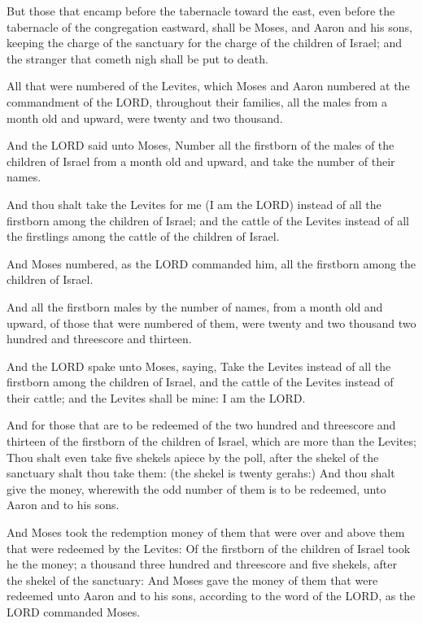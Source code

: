 \Verse But those that encamp before the tabernacle toward the east, even
before the tabernacle of the congregation eastward, shall be Moses,
and Aaron and his sons, keeping the charge of the sanctuary for the
charge of the children of Israel; and the stranger that cometh nigh
shall be put to death.

\Verse All that were numbered of the Levites, which Moses and Aaron
numbered at the commandment of the LORD, throughout their families,
all the males from a month old and upward, were twenty and two
thousand.

\Verse And the LORD said unto Moses, Number all the firstborn of the
males of the children of Israel from a month old and upward, and take
the number of their names.

\Verse And thou shalt take the Levites for me (I am the LORD) instead of
all the firstborn among the children of Israel; and the cattle of the
Levites instead of all the firstlings among the cattle of the children
of Israel.

\Verse And Moses numbered, as the LORD commanded him, all the firstborn
among the children of Israel.

\Verse And all the firstborn males by the number of names, from a month
old and upward, of those that were numbered of them, were twenty and
two thousand two hundred and threescore and thirteen.

\Verse And the LORD spake unto Moses, saying, \Verse Take the Levites
instead of all the firstborn among the children of Israel, and the
cattle of the Levites instead of their cattle; and the Levites shall
be mine: I am the LORD.

\Verse And for those that are to be redeemed of the two hundred and
threescore and thirteen of the firstborn of the children of Israel,
which are more than the Levites; \Verse Thou shalt even take five
shekels apiece by the poll, after the shekel of the sanctuary shalt
thou take them: (the shekel is twenty gerahs:) \Verse And thou shalt
give the money, wherewith the odd number of them is to be redeemed,
unto Aaron and to his sons.

\Verse And Moses took the redemption money of them that were over and
above them that were redeemed by the Levites: \Verse Of the firstborn of
the children of Israel took he the money; a thousand three hundred and
threescore and five shekels, after the shekel of the sanctuary: \Verse
And Moses gave the money of them that were redeemed unto Aaron and to
his sons, according to the word of the LORD, as the LORD commanded
Moses.


